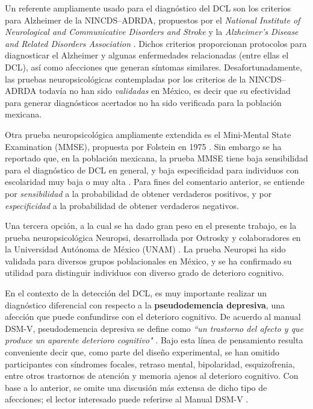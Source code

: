 \documentclass[12pt,letterpaper]{book}
\begin{document}
Un referente ampliamente usado para el diagnóstico del DCL son los criterios para Alzheimer de la NINCDS--ADRDA, propuestos %
por el \textit{National Institute of Neurological and Communicative Disorders and Stroke} y la \textit{Alzheimer's Disease and Related Disorders Association} 
\cite{Dubois07}. 
%
Dichos criterios proporcionan protocolos para diagnosticar el Alzheimer y algunas enfermedades relacionadas (entre ellas el DCL), así como afecciones que generan síntomas similares. 
%
Desafortunadamente, las pruebas neuropsicológicas contempladas por los criterios de la NINCDS--ADRDA todavía no han sido \textit{validadas} en México, es decir que su efectividad para generar diagnósticos acertados no ha sido verificada para la población mexicana. 

Otra prueba neuropsicológica ampliamente extendida es el Mini-Mental State Examination (MMSE), propuesta por Folstein en 1975 \cite{folstein75}. %
%
Sin embargo se ha reportado que, en la población mexicana, la prueba MMSE tiene baja sensibilidad para el diagnóstico de DCL en general, y baja especificidad para individuos con escolaridad muy baja o muy alta \cite{Ostrosky00}.
%
Para fines del comentario anterior, se entiende por \textit{sensibilidad} a la probabilidad de obtener verdaderos positivos, y por \textit{especificidad} a la probabilidad de obtener verdaderos negativos.


Una tercera opción, a la cual se ha dado gran peso en el presente trabajo, es la prueba neuropsicológica Neuropsi, desarrollada por Ostrosky y colaboradores en la Universidad Autónoma de México (UNAM) \cite{Ostrosky1999}.
%
La prueba Neuropsi ha sido validada para diversos grupos poblacionales en México, y se ha confirmado su utilidad para distinguir individuos con diverso grado de deterioro cognitivo.

En el contexto de la detección del DCL, es muy importante realizar un diagnóstico diferencial con respecto a la \textbf{pseudodemencia depresiva}, una afección que puede confundirse con el deterioro cognitivo.
%
De acuerdo al manual DSM-V, pseudodemencia depresiva se define como \textit{``un trastorno del afecto y que produce un aparente deterioro cognitivo"} \cite{DCM5}.
%
Bajo esta línea de pensamiento resulta conveniente decir que, como parte del diseño experimental, se han omitido participantes con síndromes focales, retraso mental, bipolaridad, esquizofrenia, entre otros trastornos de atención y memoria ajenos al deterioro cognitivo. 
%
Con base a lo anterior, se omite una discusión más extensa de dicho tipo de afecciones; el lector interesado puede referirse al Manual DSM-V \cite{DCM5}.
\end{document}
